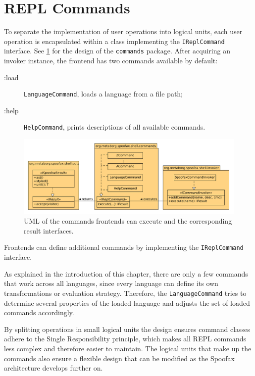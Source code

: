 \section{REPL Commands}
\label{sec:commands}

To separate the implementation of user operations into logical units, each user
operation is encapsulated within a class implementing the
\texttt{IReplCommand} interface. See \cref{fig:uml-commands} for the design
of the \texttt{commands} package. After acquiring an invoker instance, the
frontend has two commands available by default:

\begin{description}
  \item [:load] \texttt{LanguageCommand}, loads a language from a file path;
  \item [:help] \texttt{HelpCommand}, prints descriptions of all available commands.
\end{description}

\begin{figure}[h]
  \centering
  \includegraphics[width=\textwidth]{uml-commands}
  \caption{UML of the commands frontends can execute and the
           corresponding result interfaces.}
  \label{fig:uml-commands}
\end{figure}

Frontends can define additional commands by implementing the
\texttt{IReplCommand} interface.

As explained in the introduction of this chapter, there are only a few
commands that work across all languages, since every language can define its
own transformations or evaluation strategy. Therefore, the
\texttt{LanguageCommand} tries to determine several properties of the loaded
language and adjusts the set of loaded commands accordingly.

By splitting operations in small logical units the design ensures command
classes adhere to the Single Responsibility principle, which makes all REPL
commands less complex and therefore easier to maintain. The logical units that
make up the commands also ensure a flexible design that can be modified
as the Spoofax architecture develops further on.

